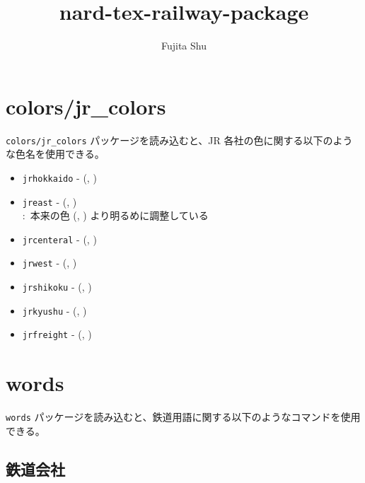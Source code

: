 \documentclass[oneside,10pt,a4paper]{jsarticle}
\title{nard-tex-railway-package}
\author{Fujita Shu}
\begin{document}
  \maketitle

  \section{colors/jr\_colors}

  \verb|colors/jr_colors| パッケージを読み込むと、JR 各社の色に関する以下のような色名を使用できる。

  \begin{itemize}
    \item \verb|jrhokkaido| -  {\footnotesize \textsf{(, )}}
    \item \verb|jreast| -  {\footnotesize \textsf{(, )}} \\
      $:$ 本来の色 {\footnotesize \textsf{(, )}} より明るめに調整している
    \item \verb|jrcenteral| -  {\footnotesize \textsf{(, )}}
    \item \verb|jrwest| -  {\footnotesize \textsf{(, )}}
    \item \verb|jrshikoku| -  {\footnotesize \textsf{(, )}}
    \item \verb|jrkyushu| -  {\footnotesize \textsf{(, )}}
    \item \verb|jrfreight| -  {\footnotesize \textsf{(, )}}
  \end{itemize}

  \newpage

  \section{words}

  \verb|words| パッケージを読み込むと、鉄道用語に関する以下のようなコマンドを使用できる。

  \subsection{鉄道会社}
\end{document}
